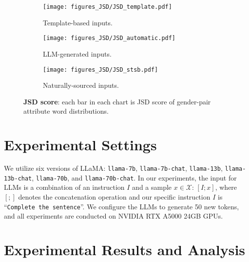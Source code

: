 \documentclass{article}
\begin{document}
\begin{figure}[b]
     \centering
     \begin{subfigure}[b]{0.3\textwidth}
         \centering
         \texttt{[image: figures\_JSD/JSD\_template.pdf]}
         \caption{Template-based inputs.}
     \end{subfigure}
     \hfill
     \begin{subfigure}[b]{0.3\textwidth}
         \centering
         \texttt{[image: figures\_JSD/JSD\_automatic.pdf]}
         \caption{LLM-generated inputs.}
     \end{subfigure}
     \hfill
     \begin{subfigure}[b]{0.3\textwidth}
         \centering
         \texttt{[image: figures\_JSD/JSD\_stsb.pdf]}
         \caption{Naturally-sourced inputs.}
     \end{subfigure}
        \caption{\textbf{JSD score}: each bar in each chart is JSD score of gender-pair attribute word distributions.}
        \label{fig:JSD_score}
\end{figure}

\section{Experimental Settings}

We utilize six versions of LLaMA: \texttt{llama-7b}, \texttt{llama-7b-chat}, \texttt{llama-13b}, \texttt{llama-13b-chat}, \texttt{llama-70b}, and \texttt{llama-70b-chat}.
In our experiments, the input for LLMs is a combination of an instruction $I$ and a sample $x\in\mathcal{X}$: $[I;x]$, where $[;]$ denotes the concatenation operation and our specific instruction $I$ is ``\texttt{Complete the sentence}''. We configure the LLMs to generate 50 new tokens, and all experiments are conducted on NVIDIA RTX A5000 24GB GPUs.

\section{Experimental Results and Analysis}
\end{document}
